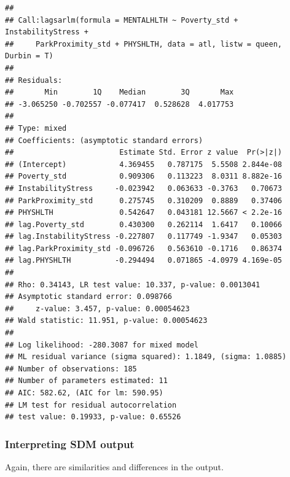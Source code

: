 \documentclass[
]{book}
\begin{document}
\begin{lstlisting}
## 
## Call:lagsarlm(formula = MENTALHLTH ~ Poverty_std + InstabilityStress + 
##     ParkProximity_std + PHYSHLTH, data = atl, listw = queen,     Durbin = T)
## 
## Residuals:
##       Min        1Q    Median        3Q       Max 
## -3.065250 -0.702557 -0.077417  0.528628  4.017753 
## 
## Type: mixed 
## Coefficients: (asymptotic standard errors) 
##                        Estimate Std. Error z value  Pr(>|z|)
## (Intercept)            4.369455   0.787175  5.5508 2.844e-08
## Poverty_std            0.909306   0.113223  8.0311 8.882e-16
## InstabilityStress     -0.023942   0.063633 -0.3763   0.70673
## ParkProximity_std      0.275745   0.310209  0.8889   0.37406
## PHYSHLTH               0.542647   0.043181 12.5667 < 2.2e-16
## lag.Poverty_std        0.430300   0.262114  1.6417   0.10066
## lag.InstabilityStress -0.227807   0.117749 -1.9347   0.05303
## lag.ParkProximity_std -0.096726   0.563610 -0.1716   0.86374
## lag.PHYSHLTH          -0.294494   0.071865 -4.0979 4.169e-05
## 
## Rho: 0.34143, LR test value: 10.337, p-value: 0.0013041
## Asymptotic standard error: 0.098766
##     z-value: 3.457, p-value: 0.00054623
## Wald statistic: 11.951, p-value: 0.00054623
## 
## Log likelihood: -280.3087 for mixed model
## ML residual variance (sigma squared): 1.1849, (sigma: 1.0885)
## Number of observations: 185 
## Number of parameters estimated: 11 
## AIC: 582.62, (AIC for lm: 590.95)
## LM test for residual autocorrelation
## test value: 0.19933, p-value: 0.65526
\end{lstlisting}

\hypertarget{interpreting-sdm-output}{%
\subsubsection{Interpreting SDM output}\label{interpreting-sdm-output}}

Again, there are similarities and differences in the output.
\end{document}
